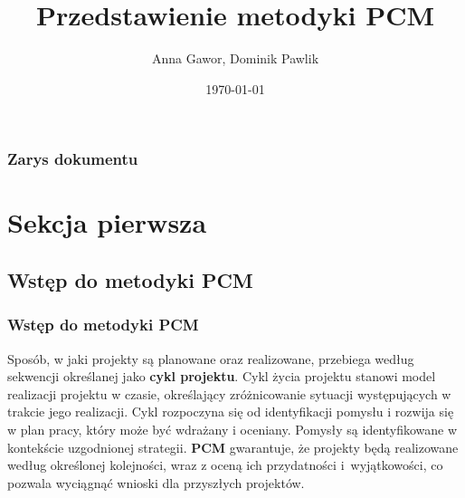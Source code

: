 \documentclass{beamer}
\title[Metodyka PCM]{Przedstawienie metodyki PCM}
\institute[ISI]{Inżynieria Systemów Informacyjnych}
\author{Anna Gawor, Dominik Pawlik}
\date{\today}
\newcommand*\titleTOC{Zarys dokumentu}
\begin{document}
{
%
\frame{\titlepage}
}

{
\begin{frame}\frametitle{\titleTOC}
	\tableofcontents
\end{frame}
}

\section{Sekcja pierwsza}
\subsection{Wstęp do metodyki PCM}

\begin{frame}\frametitle{Wstęp do metodyki PCM}
    \begin{justify}
    Sposób, w jaki projekty są planowane oraz realizowane, przebiega według sekwencji określanej jako \textbf{cykl projektu}. Cykl życia projektu stanowi model realizacji projektu w czasie, określający zróżnicowanie sytuacji występujących w trakcie jego realizacji. Cykl rozpoczyna się od identyfikacji pomysłu i rozwija się w plan pracy, który może być wdrażany i oceniany. Pomysły są identyfikowane w kontekście uzgodnionej strategii.
    \textbf{PCM} gwarantuje, że projekty będą realizowane według określonej kolejności, wraz z oceną ich przydatności i wyjątkowości, co pozwala wyciągnąć wnioski dla przyszłych projektów. 
    \end{justify}
\end{frame}
\end{document}

